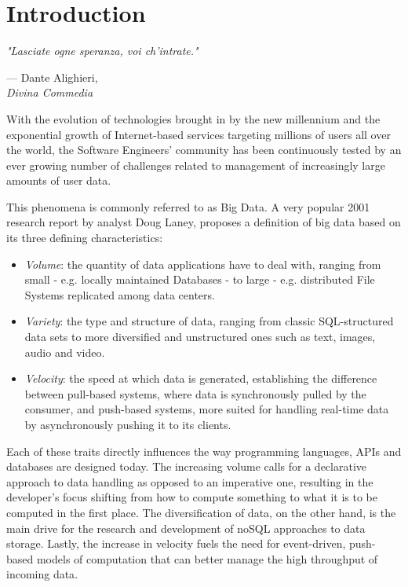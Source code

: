 \let\textcircled=\pgftextcircled
\chapter*[Introduction]{Introduction}
\label{chap:intro}

\epigraph{\hspace{4ex}\textit{"Lasciate ogne speranza, voi ch'intrate."}}{--- Dante Alighieri,\\ \textit{Divina Commedia}}


 
With the evolution of technologies brought in by the new millennium and the exponential growth of Internet-based services targeting millions of users all over the world, the Software Engineers' community has been continuously tested by an ever growing number of challenges related to management of increasingly large amounts of user data\cite{furht2010handbook}. 

This phenomena is commonly referred to as Big Data. A very popular 2001 research report\cite{laney20013d} by analyst Doug Laney, proposes a definition of big data based on its three defining characteristics:

\begin{itemize}
\item \textit{Volume}: the quantity of data applications have to deal with, ranging from small - e.g. locally maintained Databases - to large - e.g. distributed File Systems replicated among data centers.
\item \textit{Variety}: the type and structure of data, ranging from classic SQL-structured data sets to more diversified and unstructured ones such as text, images, audio and  video. 
\item \textit{Velocity}: the speed at which data is generated, establishing the difference between pull-based systems, where data is synchronously pulled by the consumer, and push-based systems, more suited for handling real-time data by asynchronously pushing it to its clients.
\end{itemize}

Each of these traits directly influences the way programming languages, APIs and databases are designed today. The increasing volume calls for a declarative approach to data handling as opposed to an imperative one, resulting in the developer's focus shifting from how to compute something to what it is to be computed in the first place\cite{fahland2009declarative}. The diversification of data, on the other hand, is the main drive for the research and development of noSQL approaches to data storage. Lastly, the increase in velocity fuels the need for event-driven, push-based models of computation that can better manage the high throughput of incoming data\cite{meijer2012your}. 

